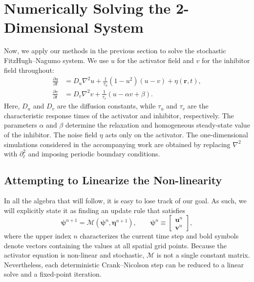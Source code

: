 \section{Numerically Solving the 2-Dimensional System}

Now, we apply our methods in the previous section to solve the stochastic
FitzHugh--Nagumo system.  We use \(u\) for the activator field and \(v\) for
the inhibitor field throughout:
\begin{align}
  \frac{\partial u}{\partial t}
    &= D_u \nabla^2 u
      + \frac{1}{\tau_u}(1-u^2)(u-v)
      + \eta(\mathbf r,t),
      \label{eq:fhn-u}\\
  \frac{\partial v}{\partial t}
    &= D_v \nabla^2 v
      + \frac{1}{\tau_v}(u-\alpha v+\beta).
      \label{eq:fhn-v}
\end{align}
Here, \(D_u\) and \(D_v\) are the diffusion constants, while \(\tau_u\)
and \(\tau_v\) are the characteristic response times of the activator and
inhibitor, respectively.  The parameters \(\alpha\) and \(\beta\) determine
the relaxation and homogeneous steady-state value of the inhibitor.  The
noise field \(\eta\) acts only on the activator.  The one-dimensional
simulations considered in the accompanying work are obtained by replacing
\(\nabla^2\) with \(\partial_\ell^2\) and imposing periodic boundary
conditions.

\subsection{Attempting to Linearize the Non-linearity}

In all the algebra that will follow, it is easy to lose track of our goal.
As such, we will explicitly state it as finding an update rule that
satisfies
\begin{equation}
  \boldsymbol{\psi}^{n+1}
    = \mathcal M\!\left(\boldsymbol{\psi}^n,
      \boldsymbol{\eta}^{n+1}\right),
  \qquad
  \boldsymbol{\psi}^n \equiv
  \begin{bmatrix}
    \boldsymbol u^n\\
    \boldsymbol v^n
  \end{bmatrix},
  \label{eq:update-goal}
\end{equation}
where the upper index \(n\) characterizes the current time step and bold
symbols denote vectors containing the values at all spatial grid points.
Because the activator equation is non-linear and stochastic,
\(\mathcal M\) is not a single constant matrix.  Nevertheless, each
deterministic Crank--Nicolson step can be reduced to a linear solve and a
fixed-point iteration.

